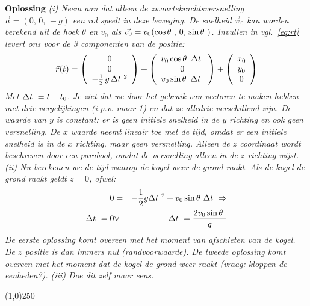 \begin{voorbeeld}
{\bf Oplossing} {\it (i) Neem aan dat alleen de zwaartekrachtsversnelling $\vec{a}=(0,\,0,\,-g)$ een rol speelt in 
deze beweging. De snelheid $\vec{v}_0$ kan worden berekend uit de hoek $\theta$ en $v_0$ als 
$\vec{v_0} = v_0 (\cos\theta~,\,0,\,\sin\theta~)$. Invullen in vgl.~\ref{eq:rt} levert ons voor de 3 componenten 
van de positie:
\begin{equation}
\vec{r}(t) =
\left(\begin{array}{c}
0 \\
0 \\
-\frac{1}{2}\, g\,\Delta t~^2
\end{array}\right)
+
\left(\begin{array}{c}
v_0 \cos\theta~ \, \Delta t~\\
0 \\
v_0 \sin\theta~ \, \Delta t~
\end{array}\right) 
+
\left(\begin{array}{c}
           x_0 \\
           y_0 \\
           0     \\
\end{array}\right)
\end{equation}
Met $\Delta t~ = t-t_0$. Je ziet dat we door het gebruik van vectoren te maken hebben met drie vergelijkingen (i.p.v. maar 1)
en dat ze alledrie verschillend zijn. De waarde van $y$ is constant: er is geen initiele snelheid in de $y$ richting en ook 
geen versnelling. De $x$ waarde neemt lineair toe met de tijd, omdat er een initiele snelheid is in de $x$ richting, maar
geen versnelling. Alleen de $z$ coordinaat wordt beschreven door een parabool, omdat de versnelling alleen in de $z$
richting wijst. (ii) Nu berekenen we de tijd waarop de kogel weer de grond raakt. Als de kogel de grond raakt geldt $z=0$,
ofwel:
\begin{eqnarray}
0 & = & -\frac{1}{2} g \Delta t~^2 + v_0 \sin\theta~ \Delta t~ \Rightarrow \\
\Delta t~ = 0 & \vee & \Delta t~ = \frac{2 v_0 \sin\theta~}{g}
\end{eqnarray}
De eerste oplossing komt overeen met het moment van afschieten van de kogel. De $z$ positie is 
dan immers  nul (randvoorwaarde). De tweede oplossing komt overeen met het moment dat de 
kogel de grond weer raakt (vraag: kloppen
de eenheden?). (iii) Doe dit zelf maar eens.
}
\end{voorbeeld}

\begin{center}
\line(1,0){250}
\end{center}

